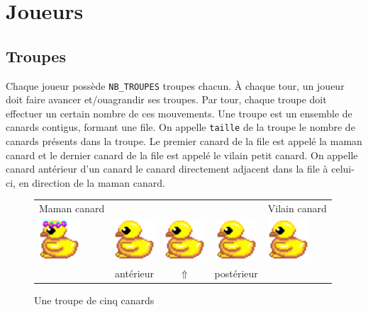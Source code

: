 \section{Joueurs}

\subsection{Troupes}

Chaque joueur possède \texttt{NB\_TROUPES} troupes chacun. 
À chaque tour, un joueur doit faire avancer et/ouagrandir ses troupes.
Par tour, chaque troupe doit effectuer un certain nombre de ces mouvements.
Une troupe est un ensemble de canards contigus, formant une file.
On appelle \og\texttt{taille}\fg{} de la troupe le nombre de canards présents dans la troupe.
Le premier canard de la file est appelé la \og maman canard\fg{} et le
dernier canard de la file est appelé le \og vilain petit canard\fg.
On appelle \og canard antérieur d'un canard\fg{} le canard directement adjacent
dans la file à celui-ci, en direction de la maman canard.

\begin{figure}[ht]
    \begin{center}
    \begin{tabular}{p{1.5cm} c c c p{1.5cm}}
        Maman canard &&&& Vilain canard \\
        \includegraphics[width=1.5cm]{img/sprite/ducks/duck_W_1.png} &
        \includegraphics[width=1.5cm]{img/sprite/ducks/duckling_W_1.png} &
        \includegraphics[width=1.5cm]{img/sprite/ducks/duckling_W_1.png} &
        \includegraphics[width=1.5cm]{img/sprite/ducks/duckling_W_1.png} &
        \includegraphics[width=1.5cm]{img/sprite/ducks/duckling_W_1.png} \\
        & antérieur & $\Uparrow$ & postérieur &

    \end{tabular}
    \end{center}
    \caption{Une troupe de cinq canards}
    \label{fig:troupe}
\end{figure}

